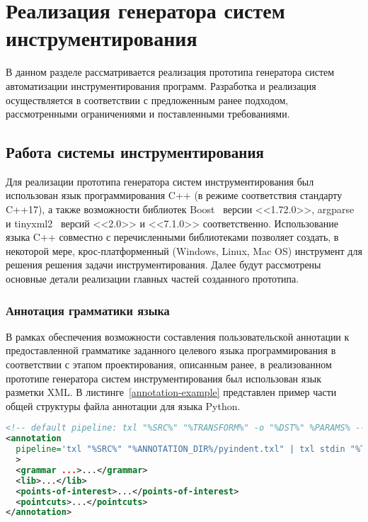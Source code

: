 \chapter{Реализация генератора систем инструментирования}

В данном разделе рассматривается реализация прототипа генератора систем автоматизации инструментирования программ.
Разработка и реализация осуществляется в соответствии с предложенным ранее подходом, рассмотренными ограничениями и поставленными требованиями.

\section{Работа системы инструментирования}

Для реализации прототипа генератора систем инструментирования был использован язык программирования C++ (в режиме соответствия стандарту C++17), а также возможности библиотек Boost~\cite{boost} версии <<1.72.0>>, argparse~\cite{argparse} и tinyxml2~\cite{tinyxml2} версий <<2.0>> и <<7.1.0>> соответственно.
Использование языка C++ совместно с перечисленными библиотеками позволяет создать, в некоторой мере, крос-платформенный (Windows, Linux, Mac OS) инструмент для решения решения задачи инструментирования.
Далее будут рассмотрены основные детали реализации главных частей созданного прототипа.

\subsection{Аннотация грамматики языка}

В рамках обеспечения возможности составления пользовательской аннотации к предоставленной грамматике заданного целевого языка программирования в соответствии с этапом проектирования, описанным ранее, в реализованном прототипе генератора систем инструментирования был использован язык разметки XML.
В листинге~\ref{annotation-example} представлен пример части общей структуры файла аннотации для языка Python.

\begin{lstlisting}[frame=single, language=XML, label={annotation-example}, caption={Пример общей структуры файла аннотации.}]
<!-- default pipeline: txl "%SRC%" "%TRANSFORM%" -o "%DST%" %PARAMS% -->
<annotation
  pipeline='txl "%SRC%" "%ANNOTATION_DIR%/pyindent.txl" | txl stdin "%TRANSFORM%" -o "%DST%" %PARAMS%'
  >
  <grammar ...>...</grammar>
  <lib>...</lib>
  <points-of-interest>...</points-of-interest>
  <pointcuts>...</pointcuts>
</annotation>
\end{lstlisting}

